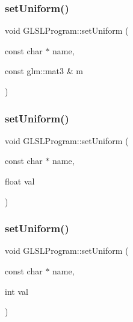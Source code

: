 \subsubsection{\texorpdfstring{setUniform()}{setUniform()}\hspace{0.1cm}{\footnotesize\ttfamily [6/10]}}
{\footnotesize\ttfamily void G\+L\+S\+L\+Program\+::set\+Uniform (\begin{DoxyParamCaption}\item[{const char $\ast$}]{name,  }\item[{const glm\+::mat3 \&}]{m }\end{DoxyParamCaption})}

\mbox{\label{class_g_l_s_l_program_aae087de52f91a47ac23c9f6ebf369bc3}} 
\subsubsection{\texorpdfstring{setUniform()}{setUniform()}\hspace{0.1cm}{\footnotesize\ttfamily [7/10]}}
{\footnotesize\ttfamily void G\+L\+S\+L\+Program\+::set\+Uniform (\begin{DoxyParamCaption}\item[{const char $\ast$}]{name,  }\item[{float}]{val }\end{DoxyParamCaption})}

\mbox{\label{class_g_l_s_l_program_a437782e359f10918044f1bbad0a98148}} 
\subsubsection{\texorpdfstring{setUniform()}{setUniform()}\hspace{0.1cm}{\footnotesize\ttfamily [8/10]}}
{\footnotesize\ttfamily void G\+L\+S\+L\+Program\+::set\+Uniform (\begin{DoxyParamCaption}\item[{const char $\ast$}]{name,  }\item[{int}]{val }\end{DoxyParamCaption})}

\mbox{\label{class_g_l_s_l_program_acfab16fafb4617f0625f170b39716eb8}} 
